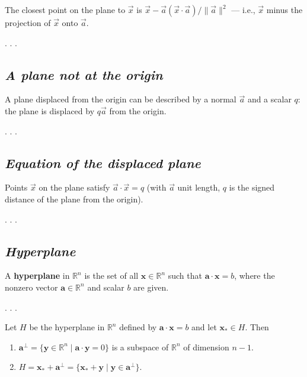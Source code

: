 \documentclass[
  letterpaper,
  DIV=11,
  numbers=noendperiod]{scrartcl}
\begin{document}
The closest point on the plane to \(\vec x\) is
\(\vec x - \vec a (\vec x \cdot \vec a)/\|\vec a\|^2\) --- i.e.,
\(\vec x\) minus the projection of \(\vec x\) onto \(\vec a\).

. . .

\subsection{\texorpdfstring{\emph{A plane not at the
origin}}{A plane not at the origin}}\label{a-plane-not-at-the-origin}

A plane displaced from the origin can be described by a normal
\(\vec a\) and a scalar \(q\): the plane is displaced by \(q \vec a\)
from the origin.

. . .

\subsection{\texorpdfstring{\emph{Equation of the displaced
plane}}{Equation of the displaced plane}}\label{equation-of-the-displaced-plane}

Points \(\vec x\) on the plane satisfy \(\vec a \cdot \vec x = q\) (with
\(\vec a\) unit length, \(q\) is the signed distance of the plane from
the origin).

. . .

\subsection{\texorpdfstring{\emph{Hyperplane}}{Hyperplane}}\label{hyperplane}

A \textbf{hyperplane} in \(\mathbb{R}^{n}\) is the set of all
\(\mathbf{x} \in \mathbb{R}^{n}\) such that
\(\mathbf{a} \cdot \mathbf{x}=b\), where the nonzero vector
\(\mathbf{a} \in \mathbb{R}^{n}\) and scalar \(b\) are given.

. . .

Let \(H\) be the hyperplane in \(\mathbb{R}^{n}\) defined by
\(\mathbf{a} \cdot \mathbf{x}=b\) and let \(\mathbf{x}_{*} \in H\). Then

\begin{enumerate}
\def\labelenumi{(\arabic{enumi})}
\item
  \(\mathbf{a}^{\perp}=\{\mathbf{y} \in \mathbb{R}^{n} \mid \mathbf{a} \cdot \mathbf{y}=0\}\)
  is a subspace of \(\mathbb{R}^{n}\) of dimension \(n-1\).
\item
  \(H=\mathbf{x}_{*}+\mathbf{a}^{\perp}=\{\mathbf{x}_{*}+\mathbf{y} \mid \mathbf{y} \in \mathbf{a}^{\perp}\}\).
\end{enumerate}
\end{document}
